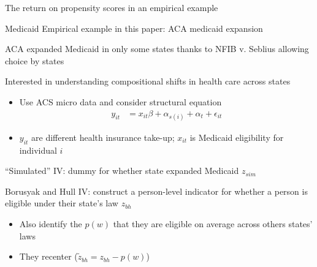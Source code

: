 \documentclass[notes,11pt, aspectratio=169]{beamer}
\newenvironment{wideitemize}{\itemize\addtolength{\itemsep}{10pt}}{\enditemize}
\begin{document}
\begin{frame}{The return on propensity scores in an empirical example}
  \begin{wideitemize}
  \item Medicaid Empirical example in this paper: ACA medicaid expansion
  \item ACA expanded Medicaid in only some states thanks to NFIB v. Seblius allowing choice by states
  \item Interested in understanding compositional shifts in health care across states
    \begin{itemize}
    \item Use ACS micro data and consider structural equation
      \begin{align*}
        y_{it} &= x_{it}\beta + \alpha_{s(i)} + \alpha_{t} + \epsilon_{it}
      \end{align*}
    \item $y_{it} $ are different health insurance take-up; $x_{it}$ is Medicaid eligibility for individual $i$
    \end{itemize}
  \item ``Simulated'' IV: dummy for whether state expanded Medicaid $z_{sim}$
  \item Borusyak and Hull IV: construct a person-level indicator for
    whether a person is eligible under their state's law $z_{bh}$
    \begin{itemize}
    \item Also identify the $p(w)$ that they are eligible on average across others states' laws
    \item They recenter ($\tilde{z}_{bh} = z_{bh} - p(w)$) 
    \end{itemize}
  \end{wideitemize}
\end{frame}
\end{document}
